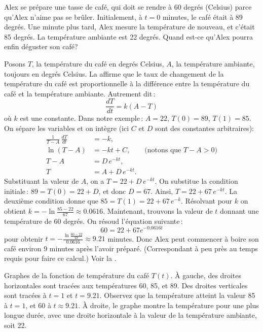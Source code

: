 \begin{example} \label{sep:coffeeexample}
Alex se prépare une tasse de café, qui doit se rendre à 60 degrés (Celsius) parce qu'Alex n'aime pas se brûler.  Initialement, à $t=0$ minutes,
le café était à 89 degrés.  Une minute plus tard, Alex mesure la température de nouveau, et c'était 85 degrés.  La température ambiante est 22 degrés.  Quand est-ce qu'Alex pourra enfin déguster son café?

Posons $T$, la température du café en degrés Celsius, $A$, la température ambiante, toujours en degrés Celsius. La 
 affirme que le taux de changement de la température du café est proportionnelle à la différence entre la température du café et la température ambiante.  Autrement dit\,: 
%
\begin{equation*}
\frac{dT}{dt} = k(A-T) 
\end{equation*}
où $k$ est une constante.
Dans notre exemple\,: $A=22$, $T(0) = 89$, $T(1) = 85$.
On sépare les variables et on intègre (ici $C$ et $D$ sont des constantes arbitraires):
\begin{align*}
\frac{1}{T-A} \, \frac{dT}{dt} & = -k , \\
\ln (T-A) &= -kt + C , \qquad \text{(notons que } T-A > 0 \text{)} \\
T-A &= D\, e^{-kt} ,  \\
T &= A + D\, e^{-kt} .
\end{align*}
Substituant la valeur de $A$, on a 
$T = 22 + D\, e^{-kt}$.  On substitue la condition initiale\,: $89 = T(0) = 22 +
D$,
et donc $D = 67$.  Ainsi, 
$T = 22 + 67\, e^{-kt}$.  La deuxième condition donne que $85 = T(1) = 
22 + 67\, e^{-k}$.  Résolvant pour $k$ on obtient 
$k = - \ln \frac{85-22}{67} \approx 0.0616$.  Maintenant, trouvons la valeur de $t$ donnant une température de 60 degrés.  On résoud l'équation suivante\,: 
\begin{equation*}
60 = 22 + 67 e^{-0.0616t}
\end{equation*}
pour obtenir 
$t = - \frac{\ln \frac{60-22}{67}}{0.0616} \approx 9.21$ minutes.  Donc Alex peut commencer à boire son café environ 9 minutes après l'avoir préparé.  (Correspondant à peu près au temps requis pour faire ce calcul.)  Voir la .
\begin{myfig}
\capstart
\caption{Graphes de la fonction de température du café $T(t)$.
À gauche, des droites horizontales sont tracées aux températures 60, 85, et 89.  Des droites verticales sont tracées à $t=1$ et $t=9.21$.  Observez que la température atteint la valeur 85 à $t=1$, et 60 à 
$t \approx 9.21$.  À droite, le graphe montre la température pour une plus longue durée, avec une droite horizontale à la valeur de la température ambiante, soit 22.\label{sintro:coffeefig}}
\end{myfig}
\end{example}

